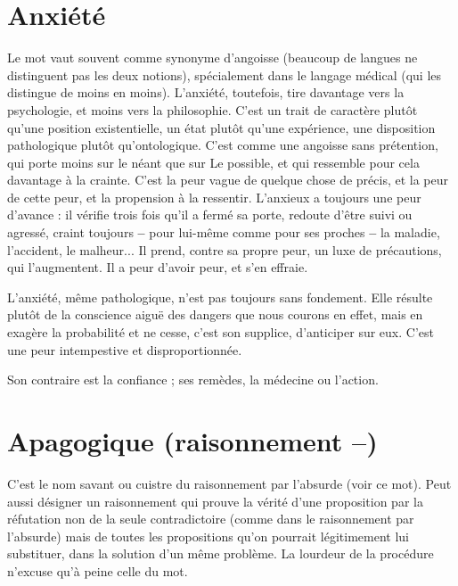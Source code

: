 \section{Anxiété}
Le mot vaut souvent comme synonyme d’angoisse (beaucoup de
langues ne distinguent pas les deux notions), spécialement dans
le langage médical (qui les distingue de moins en moins). L’anxiété, toutefois,
tire davantage vers la psychologie, et moins vers la philosophie. C’est un trait
de caractère plutôt qu’une position existentielle, un état plutôt qu’une expérience,
une disposition pathologique plutôt qu’ontologique. C’est comme une
angoisse sans prétention, qui porte moins sur le néant que sur Le possible, et
qui ressemble pour cela davantage à la crainte. C’est la peur vague de quelque
chose de précis, et la peur de cette peur, et la propension à la ressentir.
L’anxieux a toujours une peur d’avance : il vérifie trois fois qu’il a fermé sa
porte, redoute d’être suivi ou agressé, craint toujours {\bf --} pour lui-même
comme pour ses proches {\bf --} la maladie, l’accident, le malheur... Il prend,
contre sa propre peur, un luxe de précautions, qui l’augmentent. Il a peur
d’avoir peur, et s’en effraie.

L’anxiété, même pathologique, n’est pas toujours sans fondement. Elle
résulte plutôt de la conscience aiguë des dangers que nous courons en effet,
mais en exagère la probabilité et ne cesse, c’est son supplice, d’anticiper sur eux.
C’est une peur intempestive et disproportionnée.

Son contraire est la confiance ; ses remèdes, la médecine ou l’action.

\section{Apagogique (raisonnement {\bf --})}
C’est le nom savant ou cuistre du
raisonnement par l’absurde (voir ce
mot). Peut aussi désigner un raisonnement qui prouve la vérité d’une proposition
par la réfutation non de la seule contradictoire (comme dans le raisonnement
par l’absurde) mais de toutes les propositions qu’on pourrait légitimement
lui substituer, dans la solution d’un même problème. La lourdeur de la
procédure n’excuse qu’à peine celle du mot.

